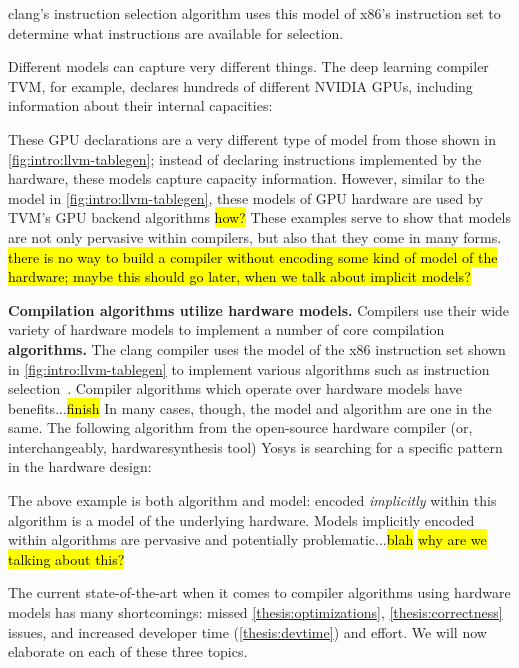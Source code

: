 \noindent
clang's instruction selection algorithm
  uses
  this model of
  x86's instruction set
  to determine what instructions
  are available for selection.

Different models
  can capture very different things.
The deep learning compiler TVM,
  for example,
  declares 
  hundreds of different NVIDIA GPUs,
  including information
  about their internal capacities:



\noindent
These GPU declarations
  are a very different type of model
  from those shown in
  \cref{fig:intro:llvm-tablegen};
  instead of declaring instructions
  implemented by the hardware,
  these models capture
  capacity information.
However, similar to the model in 
  \cref{fig:intro:llvm-tablegen},
  these models of GPU hardware
  are used by TVM's GPU backend
  algorithms
  \hl{how?}
These examples serve to show
  that models are not only pervasive
  within compilers,
  but also that
  they come in many forms.
\hl{there is no way to build a compiler
  without encoding some kind 
  of model of the hardware;
  maybe this should go later, when we talk about implicit models?}

\textbf{Compilation algorithms
  utilize hardware models.}
Compilers use their
  wide variety of
  hardware models
  to implement a number of core
  compilation
  \textbf{algorithms.}
The clang compiler uses 
  the model of the x86 instruction set
  shown in \cref{fig:intro:llvm-tablegen}
  to implement
  various algorithms
  such as instruction 
  selection~\cite{llvminstructionselection}.
Compiler algorithms
  which operate over hardware models
  have benefits...\hl{finish}
In many cases, though,
  the model and algorithm are 
  one in the same.
The following algorithm
  from the open-source hardware compiler
  (or, interchangeably,
    \gls{hardwaresynthesis} tool)
  Yosys
  is searching for a specific pattern 
  in the hardware design:



\noindent
The above example is both algorithm
  and model:
  encoded \textit{implicitly}
  within this algorithm
  is a model of the underlying hardware.
Models implicitly encoded within algorithms
  are pervasive and potentially problematic...\hl{blah}
\hl{why are we talking about this?}
  

The current state-of-the-art
  when it comes to compiler algorithms
  using hardware models
  has many shortcomings:
  missed
  \cref{thesis:optimizations},
  \cref{thesis:correctness}
  issues,
  and 
  increased developer time
  (\cref{thesis:devtime})
  and effort.
We will now
  elaborate on each of these three topics.

